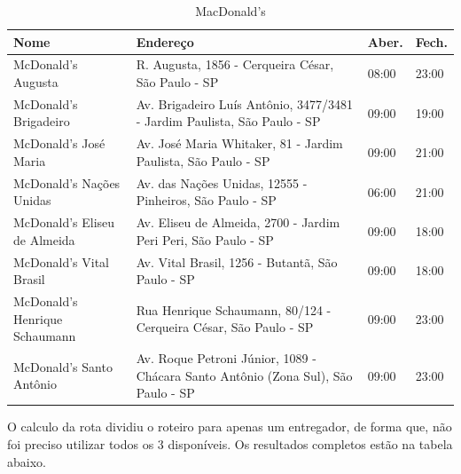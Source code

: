 \begin{table}[h]
	\centering
	\caption{MacDonald's}
	\label{Roteiro3}
	\begin{tabular}{C{3cm}C{8cm}C{2cm}C{2cm}}
		\toprule
		Nome                     & Endereço                                                         & Aber. & Fech. \\ \midrule
		McDonald's Augusta            & R. Augusta, 1856 - Cerqueira César, São Paulo - SP                                & 08:00    & 23:00      \\
		McDonald's Brigadeiro         & Av. Brigadeiro Luís Antônio, 3477/3481 - Jardim Paulista, São Paulo - SP          & 09:00    & 19:00      \\
		McDonald's José Maria         & Av. José Maria Whitaker, 81 - Jardim Paulista, São Paulo - SP                     & 09:00    & 21:00      \\
		McDonald's Nações Unidas      & Av. das Nações Unidas, 12555 - Pinheiros, São Paulo - SP                          & 06:00    & 21:00      \\
		McDonald's Eliseu de Almeida  & Av. Eliseu de Almeida, 2700 - Jardim Peri Peri, São Paulo - SP                    & 09:00    & 18:00      \\
		McDonald's Vital Brasil       & Av. Vital Brasil, 1256 - Butantã, São Paulo - SP                                  & 09:00    & 18:00      \\
		McDonald's Henrique Schaumann & Rua Henrique Schaumann, 80/124 - Cerqueira César, São Paulo - SP                  & 09:00    & 23:00      \\
		McDonald's Santo Antônio      & Av. Roque Petroni Júnior, 1089 - Chácara Santo Antônio (Zona Sul), São Paulo - SP & 09:00    & 23:00 \\ \bottomrule
	\end{tabular}
\end{table}
O calculo da rota dividiu o roteiro para apenas um entregador, de forma que, não foi preciso utilizar todos os 3 disponíveis. Os resultados completos estão na tabela abaixo.

\begin{center}
	\label{fig:MacDonalts-Entregador1}
\end{center}

